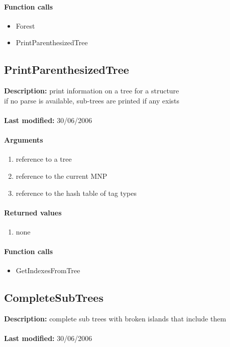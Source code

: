 \paragraph{Function calls}
\begin{itemize}
\item Forest
\item PrintParenthesizedTree
\end{itemize}

\subsection{PrintParenthesizedTree}
\textbf{Description:} print information on a tree for a structure\\
if no parse is available, sub-trees are printed if any exists\\
\\\textbf{Last modified:} 30/06/2006

\paragraph{Arguments}
\begin{enumerate}
\item reference to a tree
\item reference to the current MNP
\item reference to the hash table of tag types
\end{enumerate}

\paragraph{Returned values}
\begin{enumerate}
\item none
\end{enumerate}

\paragraph{Function calls}
\begin{itemize}
\item GetIndexesFromTree
\end{itemize}

\subsection{CompleteSubTrees}
\textbf{Description:} complete sub trees with broken islands that include them\\
\\\textbf{Last modified:} 30/06/2006

